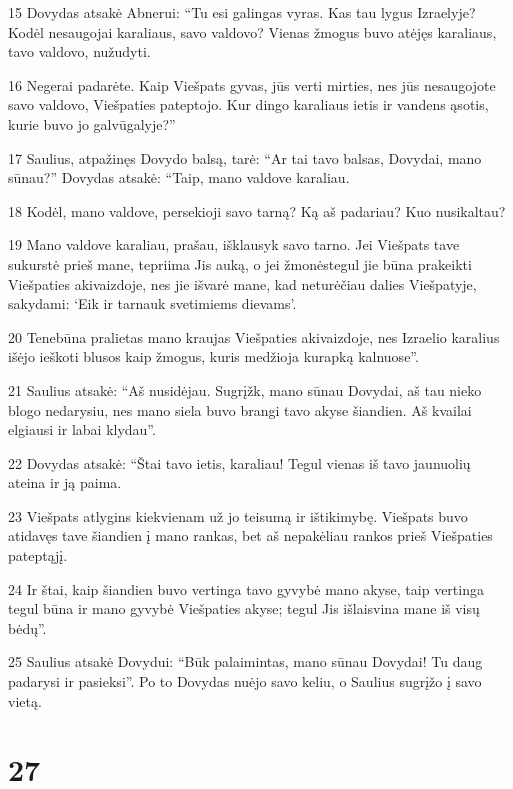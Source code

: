 \par 15 Dovydas atsakė Abnerui: “Tu esi galingas vyras. Kas tau lygus Izraelyje? Kodėl nesaugojai karaliaus, savo valdovo? Vienas žmogus buvo atėjęs karaliaus, tavo valdovo, nužudyti. 
\par 16 Negerai padarėte. Kaip Viešpats gyvas, jūs verti mirties, nes jūs nesaugojote savo valdovo, Viešpaties pateptojo. Kur dingo karaliaus ietis ir vandens ąsotis, kurie buvo jo galvūgalyje?” 
\par 17 Saulius, atpažinęs Dovydo balsą, tarė: “Ar tai tavo balsas, Dovydai, mano sūnau?” Dovydas atsakė: “Taip, mano valdove karaliau. 
\par 18 Kodėl, mano valdove, persekioji savo tarną? Ką aš padariau? Kuo nusikaltau? 
\par 19 Mano valdove karaliau, prašau, išklausyk savo tarno. Jei Viešpats tave sukurstė prieš mane, tepriima Jis auką, o jei žmonės­tegul jie būna prakeikti Viešpaties akivaizdoje, nes jie išvarė mane, kad neturėčiau dalies Viešpatyje, sakydami: ‘Eik ir tarnauk svetimiems dievams’. 
\par 20 Tenebūna pralietas mano kraujas Viešpaties akivaizdoje, nes Izraelio karalius išėjo ieškoti blusos kaip žmogus, kuris medžioja kurapką kalnuose”. 
\par 21 Saulius atsakė: “Aš nusidėjau. Sugrįžk, mano sūnau Dovydai, aš tau nieko blogo nedarysiu, nes mano siela buvo brangi tavo akyse šiandien. Aš kvailai elgiausi ir labai klydau”. 
\par 22 Dovydas atsakė: “Štai tavo ietis, karaliau! Tegul vienas iš tavo jaunuolių ateina ir ją paima. 
\par 23 Viešpats atlygins kiekvienam už jo teisumą ir ištikimybę. Viešpats buvo atidavęs tave šiandien į mano rankas, bet aš nepakėliau rankos prieš Viešpaties pateptąjį. 
\par 24 Ir štai, kaip šiandien buvo vertinga tavo gyvybė mano akyse, taip vertinga tegul būna ir mano gyvybė Viešpaties akyse; tegul Jis išlaisvina mane iš visų bėdų”. 
\par 25 Saulius atsakė Dovydui: “Būk palaimintas, mano sūnau Dovydai! Tu daug padarysi ir pasieksi”. Po to Dovydas nuėjo savo keliu, o Saulius sugrįžo į savo vietą.



\chapter{27}


